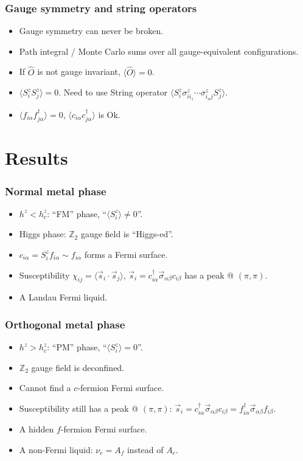\documentclass[xcolor=table, 10pt, aspectratio=43]{beamer}
\begin{document}
\begin{frame}
\frametitle{Gauge symmetry and string operators}
\begin{itemize}
\item Gauge symmetry can never be broken.
\item Path integral / Monte Carlo sums over all gauge-equivalent configurations.
\item If $\hat O$ is not gauge invariant,
$\langle\hat O\rangle = 0$.
\item $\langle S_i^zS_j^z\rangle = 0$.
Need to use String operator $\langle S_i^z\sigma^z_{ii_1}\cdots\sigma^z_{i_nj}S_j^z\rangle$.
\item $\langle f_{i\alpha}f_{j\alpha}^\dagger\rangle=0$, $\langle c_{i\alpha}c_{j\alpha}^\dagger\rangle$ is Ok.
\end{itemize}
\end{frame}

\section{Results}

\begin{frame}
\frametitle{Normal metal phase}
\begin{itemize}
\item $h^z < h_c^z$: ``FM'' phase, ``$\langle S_i^z\rangle\neq0$''.
\item Higgs phase: $\mathbb Z_2$ gauge field is ``Higgs-ed''.
\item $c_{i\alpha} = S_i^zf_{i\alpha}\sim f_{i\alpha}$ forms a Fermi surface.
\item Susceptibility
$\chi_{ij}=\langle \vec s_i\cdot\vec s_j\rangle$,
$\vec s_i=c_{i\alpha}^\dagger\vec\sigma_{\alpha\beta}c_{i\beta}$ has a peak @ $(\pi,\pi)$.
\item A Landau Fermi liquid.
\end{itemize}
\end{frame}

\begin{frame}
\frametitle{Orthogonal metal phase}
\begin{itemize}
\item $h^z > h_c^z$: ``PM'' phase, ``$\langle S_i^z\rangle=0$''.
\item $\mathbb Z_2$ gauge field is deconfined.
\item Cannot find a $c$-fermion Fermi surface.
\item Susceptibility still has a peak @ $(\pi,\pi)$: $\vec s_i= c_{i\alpha}^\dagger\vec\sigma_{\alpha\beta}c_{i\beta} 
= f_{i\alpha}^\dagger\vec\sigma_{\alpha\beta}f_{i\beta}$.
\item A hidden $f$-fermion Fermi surface.
\item A non-Fermi liquid: $\nu_e = A_f$ instead of $A_c$.
\end{itemize}
\end{frame}
\end{document}
